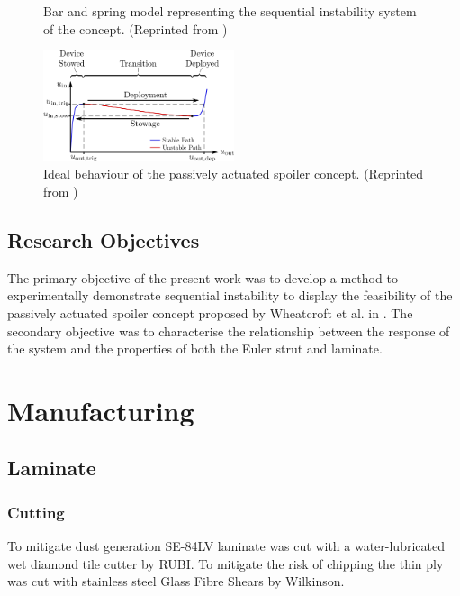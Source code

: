 \documentclass{IEEEtran}
\begin{document}
		\begin{figure}[!h]
			\centering
			
			\caption{\centering Bar and spring model representing the sequential instability system of the concept. (Reprinted from \cite{Wheatcroft_2023})}
			\label{fig:BarNSpring}
		\end{figure}
	
		\begin{figure}[!h]
			\centering
			\includegraphics[width=0.5\textwidth]{IntroductionImages/Desired_Path_V4.png}
			\caption{\centering Ideal behaviour of the passively actuated spoiler concept. (Reprinted from \cite{Wheatcroft_2023})}
			\label{fig:DesiredPath}
		\end{figure}
       
	  \subsection{Research Objectives}
        The primary objective of the present work was to develop a method to experimentally demonstrate sequential instability to display the feasibility of the passively actuated spoiler concept proposed by Wheatcroft et al. in \cite{Wheatcroft_2023}. The secondary objective was to characterise the relationship between the response of the system and the properties of both the Euler strut and laminate. 
   
		
	\section{Manufacturing}
    \subsection{Laminate}
    \subsubsection{Cutting}
    To mitigate dust generation SE-84LV laminate was cut with a water-lubricated wet diamond tile cutter by RUBI. To mitigate the risk of chipping the thin ply was cut with stainless steel Glass Fibre Shears by Wilkinson.
\end{document}
